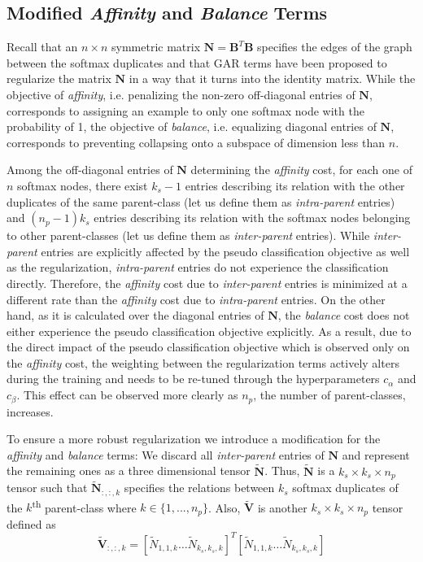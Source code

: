 \documentclass{article} \usepackage{iclr2018_conference,times}
\begin{document}
\subsection{Modified \textit{Affinity} and \textit{Balance} Terms} 

Recall that an $n \times n$ symmetric matrix $\boldsymbol{N}=\boldsymbol{B}^T\boldsymbol{B}$ specifies the edges of the graph between the softmax duplicates and that GAR terms have been proposed to regularize the matrix $\boldsymbol{N}$ in a way that it turns into the identity matrix. While the objective of \textit{affinity}, i.e. penalizing the non-zero off-diagonal entries of $\boldsymbol{N}$, corresponds to assigning an example to only one softmax node with the probability of 1, the objective of \textit{balance}, i.e. equalizing diagonal entries of $\boldsymbol{N}$, corresponds to preventing collapsing onto a subspace of dimension less than $n$. 

Among the off-diagonal entries of $\boldsymbol{N}$ determining the \textit{affinity} cost, for each one of $n$ softmax nodes, there exist $k_s-1$ entries describing its relation with the other duplicates of the same parent-class (let us define them as \textit{intra-parent} entries) and $(n_p-1)k_s$ entries describing its relation with the softmax nodes belonging to other parent-classes (let us define them as \textit{inter-parent} entries). While \textit{inter-parent} entries are explicitly affected by the pseudo classification objective as well as the regularization, \textit{intra-parent} entries do not experience the classification directly. Therefore, the \textit{affinity} cost due to \textit{inter-parent} entries is minimized at a different rate than the \textit{affinity} cost due to \textit{intra-parent} entries. On the other hand, as it is calculated over the diagonal entries of $\boldsymbol{N}$, the \textit{balance} cost does not either experience the pseudo classification objective explicitly. As a result, due to the direct impact of the pseudo classification objective which is observed only on the \textit{affinity} cost, the weighting between the regularization terms actively alters during the training and needs to be re-tuned through the hyperparameters $c_\alpha$ and $c_\beta$. This effect can be observed more clearly as $n_p$, the number of parent-classes, increases.

To ensure a more robust regularization we introduce a modification for the \textit{affinity} and \textit{balance} terms: We discard all \textit{inter-parent} entries of $\boldsymbol{N}$ and represent the remaining ones as a three dimensional tensor $\boldsymbol{\tilde N}$. Thus, $\boldsymbol{\tilde N}$ is a $k_s \times k_s \times n_p$ tensor such that $\boldsymbol{\tilde N}_{:,:,k}$ specifies the relations between $k_s$ softmax duplicates of the $k$\textsuperscript{th} parent-class where $k \in \{1,...,n_p\}$. Also, $\boldsymbol{\tilde V}$  is another $k_s \times k_s \times n_p$ tensor defined as 
\begin{equation}
\boldsymbol{\tilde V}_{:,:,k}=[\tilde N_{1,1,k}\dots \tilde N_{k_s,k_s,k}]^T[\tilde N_{1,1,k}\dots \tilde N_{k_s,k_s,k}]
\end{equation}
\end{document}
